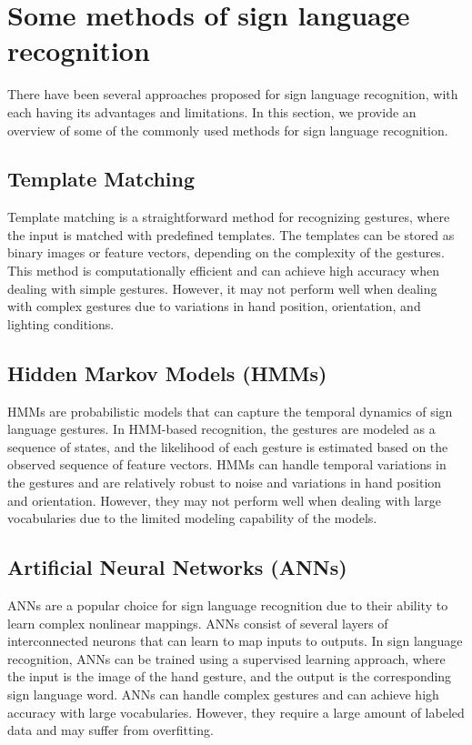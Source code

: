 \section{Some methods of sign language recognition}
There have been several approaches proposed for sign language recognition, with each having its advantages and limitations. In this section, we provide an overview of some of the commonly used methods for sign language recognition.

\subsection{Template Matching}
Template matching is a straightforward method for recognizing gestures, where the input is matched with predefined templates. The templates can be stored as binary images or feature vectors, depending on the complexity of the gestures. This method is computationally efficient and can achieve high accuracy when dealing with simple gestures. However, it may not perform well when dealing with complex gestures due to variations in hand position, orientation, and lighting conditions.

\subsection{Hidden Markov Models (HMMs)}
HMMs are probabilistic models that can capture the temporal dynamics of sign language gestures. In HMM-based recognition, the gestures are modeled as a sequence of states, and the likelihood of each gesture is estimated based on the observed sequence of feature vectors. HMMs can handle temporal variations in the gestures and are relatively robust to noise and variations in hand position and orientation. However, they may not perform well when dealing with large vocabularies due to the limited modeling capability of the models.

\subsection{Artificial Neural Networks (ANNs)}
ANNs are a popular choice for sign language recognition due to their ability to learn complex nonlinear mappings. ANNs consist of several layers of interconnected neurons that can learn to map inputs to outputs. In sign language recognition, ANNs can be trained using a supervised learning approach, where the input is the image of the hand gesture, and the output is the corresponding sign language word. ANNs can handle complex gestures and can achieve high accuracy with large vocabularies. However, they require a large amount of labeled data and may suffer from overfitting.

